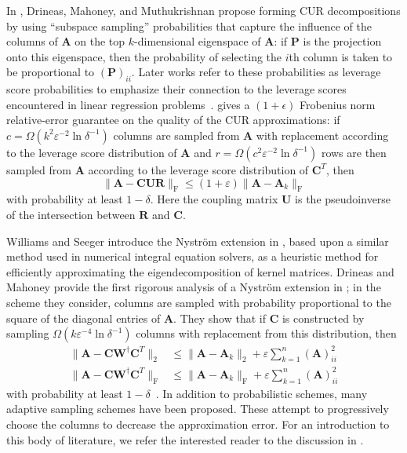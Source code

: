 \documentclass[11pt,letterpaper,twoside,reqno,nosumlimits]{amsart}
\def\pinv{\dagger}
\def\transp{T}
\newcommand{\mat}[1]{\ensuremath{\mathbf{#1}}}
\newcommand{\snorm}[1]{\ensuremath{\big\|#1\big\|_2}}
\newcommand{\fnorm}[1]{\ensuremath{\big\|#1\big\|_{\mathrm{F}}}}
\theoremstyle{remark}
\begin{document}
 In \cite{DMM08CUR}, Drineas, Mahoney, and Muthukrishnan propose forming CUR decompositions by using ``subspace sampling'' probabilities that capture the influence of the columns of $\mat{A}$ on the top $k$-dimensional eigenspace of $\mat{A}$: if $\mat{P}$ is the projection onto this eigenspace, then the probability of selecting the $i$th column is taken to be proportional to $(\mat{P})_{ii}.$ Later works refer to these probabilities as leverage score probabilities to emphasize their connection to the leverage scores encountered in linear regression problems~\cite{DM09,DM10}. \cite{DMM08CUR} gives a $(1+\epsilon)$ Frobenius norm relative-error guarantee on the quality of the CUR approximations: if $c = \Omega(k^2 \varepsilon^{-2} \ln \delta^{-1} )$ columns are sampled from $\mat{A}$ with replacement according to the leverage score distribution of $\mat{A}$ and $r = \Omega(c^2 \varepsilon^{-2} \ln \delta^{-1})$ rows are then sampled from $\mat{A}$ according to the leverage score distribution of $\mat{C}^\transp$, then
\[
 \fnorm{\mat{A} - \mat{C} \mat{U}\mat{R}} \leq (1 + \varepsilon) \fnorm{\mat{A} - \mat{A}_k}
\]
with probability at least $1-\delta.$ Here the coupling matrix $\mat{U}$ is the pseudoinverse of the intersection between $\mat{R}$ and $\mat{C}.$ 


Williams and Seeger introduce the Nystr\"om extension in \cite{SW01}, based upon a similar method used in numerical integral equation solvers, as a heuristic method for efficiently approximating the eigendecomposition of kernel matrices. %
Drineas and Mahoney provide the first rigorous analysis of a Nystr\"om extension in \cite{DM05}; in the scheme they consider, columns are sampled with probability proportional to the square of the diagonal entries of $\mat{A}$. They show that if $\mat{C}$ is constructed by sampling $\Omega(k \varepsilon^{-4} \ln\delta^{-1})$ columns with replacement from this distribution, then
\begin{align*}
\snorm{\mat{A} - \mat{C} \mat{W}^\pinv \mat{C}^\transp} & \leq \snorm{\mat{A} - \mat{A}_k} + \varepsilon \sum_{k=1}^n (\mat{A})_{ii}^2 \\
\fnorm{\mat{A} - \mat{C} \mat{W}^\pinv \mat{C}^\transp} & \leq \fnorm{\mat{A} - \mat{A}_k} + \varepsilon \sum_{k=1}^n (\mat{A})_{ii}^2
\end{align*}
with probability at least $1-\delta$~\cite{DM05}. In addition to probabilistic schemes, many adaptive sampling schemes have been proposed. These attempt to progressively choose the columns to decrease the approximation error. For an introduction to this body of literature, we refer the interested reader to the discussion in \cite{FGK11}.
\end{document}
